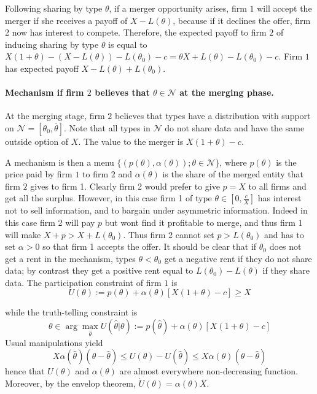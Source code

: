 \documentclass[a4paper]{article}
\newcommand{\N}{\mathcal N}
\renewcommand{\th}{\hat\theta}
\renewcommand{\t}{\theta}
\renewcommand{\a}{\alpha}
\begin{document}
Following sharing by type $\t$, if a merger opportunity arises, firm $1$ will accept the merger if she receives a payoff of $X-L(\t)$, because if it declines the offer, firm 2 now has interest to compete. Therefore, the expected payoff to firm $2$ of inducing sharing by type $\t$ is equal to $X(1+\t)-(X-L(\t))-L(\t_0)-c=\t X +L(\t)-L(\t_0)-c$. Firm $1$ has expected payoff $X-L(\t)+L(\t_0)$.


\paragraph{Mechanism if firm $2$ believes that $\t\in\N$ at the merging phase.} At the merging stage, firm $2$ believes that types have a distribution with support on $\N=[\t_0,\overline \t]$. Note that all types in $\N$ do not share data and have the same outside option of $X$. The value to the merger is $X(1+\t)-c$. 

A mechanism is then a menu $\{(p(\t),\a(\t));\t\in \N\}$, where $p(\t)$ is the price paid by firm $1$ to firm $2$ and $\a(\t)$ is the share of the merged entity that firm $2$ gives to firm 1. Clearly firm 2 would prefer to give $p=X$ to all firms and get all the surplus. However, in this case firm 1 of type $\t\in[0,\frac{c}{X}]$ has interest not to sell information, and to bargain under asymmetric information. Indeed in this case firm 2 will pay $p$ but wont find it profitable to merge, and thus firm 1 will make $X+p>X+L(\t_0)$. Thus firm 2 cannot set $p>L(\t_0)$ and has to set $\a >0$ so that firm 1 accepts the offer. It should be clear that if $\t_0$ does not get a rent in the mechanism, types $\t<\t_0$ get a negative rent if they do not share data; by contrast they get a positive rent equal to $L(\t_0)-L(\t)$ if they share data. The participation constraint of firm $1$ is
\begin{equation}
  U(\t):=p(\t)+\a(\t)[X(1+\t)-c]\geq X 
\end{equation}

while the truth-telling constraint is
\begin{equation*}
  \t \in \arg\max_{\th} U(\th|\t):=p(\th)+\a(\t)[X(1+\t)-c]
\end{equation*}
%
Usual manipulations yield 
%
\[
  X \a(\th)(\t-\th)\leq U(\t)-U(\th)\leq X\a(\t)(\t-\th)
\]
%
hence that $U(\t)$ and $\a(\t)$ are almost everywhere non-decreasing function. Moreover, by the envelop theorem, $\dot U(\theta)=\a(\t)X$. 
\end{document}
